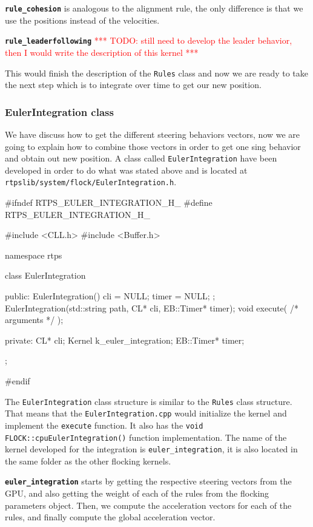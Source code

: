 \texttt{\textbf{rule\_cohesion}} is analogous to the alignment rule, the only difference is that we use the positions instead of the velocities.

\texttt{\textbf{rule\_leaderfollowing}} \textcolor{red}{*** TODO: still need to develop the leader behavior, then I would write the description of this kernel ***}

This would finish the description of the \texttt{Rules} class and now we are ready to take the next step which is to integrate over time to get our new position.

\subsubsection{EulerIntegration class}
We have discuss how to get the different steering behaviors vectors, now we are going to explain how to combine those vectors in order to get one sing behavior and obtain out new position. A class called \texttt{EulerIntegration} have been developed in order to do what was stated above and is located at \texttt{rtpslib/system/flock/EulerIntegration.h}.

\begin{cppcode}{0}
#ifndef RTPS_EULER_INTEGRATION_H_
#define RTPS_EULER_INTEGRATION_H_

#include <CLL.h>
#include <Buffer.h>

namespace rtps
{
	class EulerIntegration
	{
		public:
			EulerIntegration() { cli = NULL; timer = NULL; };
	 		EulerIntegration(std::string path, CL* cli, EB::Timer* timer);
			void execute( /* arguments */ );

		private:
			CL* cli;
			Kernel k_euler_integration;
			EB::Timer* timer;
	};
}
#endif
\end{cppcode}

The \texttt{EulerIntegration} class structure is similar to the \texttt{Rules} class structure. That means that the \texttt{EulerIntegration.cpp} would initialize the kernel and implement the \texttt{execute} function. It also has the \texttt{void FLOCK::cpuEulerIntegration()} function implementation. The name of the kernel developed for the integration is \texttt{euler\_integration}, it is also located in the same folder as the other flocking kernels.

\texttt{\textbf{euler\_integration}} starts by getting the respective steering vectors from the GPU, and also getting the weight of each of the rules from the flocking parameters object. Then, we compute the acceleration vectors for each of the rules, and finally compute the global acceleration vector.

